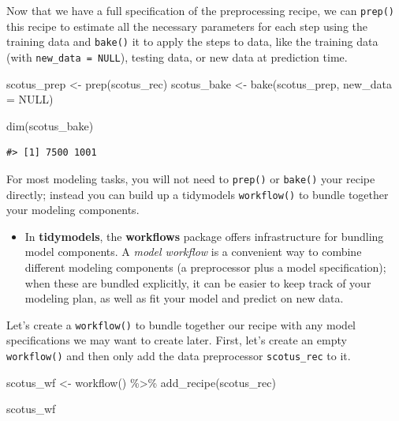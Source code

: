 \documentclass[
]{krantz}
\makeatletter
\newenvironment{Shaded}{\begin{snugshade}}{\end{snugshade}}
\newcommand{\AttributeTok}[1]{\textcolor[rgb]{0.77,0.63,0.00}{#1}}
\newcommand{\ConstantTok}[1]{\textcolor[rgb]{0.00,0.00,0.00}{#1}}
\newcommand{\FunctionTok}[1]{\textcolor[rgb]{0.00,0.00,0.00}{#1}}
\newcommand{\NormalTok}[1]{#1}
\newcommand{\OtherTok}[1]{\textcolor[rgb]{0.56,0.35,0.01}{#1}}
\newcommand{\SpecialCharTok}[1]{\textcolor[rgb]{0.00,0.00,0.00}{#1}}
\newenvironment{kframe}{%
\medskip{}
\setlength{\fboxsep}{.8em}
 \def\at@end@of@kframe{}%
 \ifinner\ifhmode%
  \def\at@end@of@kframe{\end{minipage}}%
  \begin{minipage}{\columnwidth}%
 \fi\fi%
 \def\FrameCommand##1{\hskip\@totalleftmargin \hskip-\fboxsep
 \colorbox{shadecolor}{##1}\hskip-\fboxsep
     \hskip-\linewidth \hskip-\@totalleftmargin \hskip\columnwidth}%
 \MakeFramed {\advance\hsize-\width
   \@totalleftmargin\z@ \linewidth\hsize
   \@setminipage}}%
 {\par\unskip\endMakeFramed%
 \at@end@of@kframe}
\renewenvironment{Shaded}{\begin{kframe}}{\end{kframe}}
\newenvironment{rmdblock}[1]
  {\begin{shaded*}
  \begin{itemize}[left = -1cm, labelsep = 1cm]
  \renewcommand{\labelitemi}{
    \raisebox{-.7\height}[0pt][0pt]{
      {\setkeys{Gin}{width=3em,keepaspectratio}\texttt{[image: images/\#1]}}
    }
  }
 
  \item
  }
  {
  \end{itemize}
  \end{shaded*}
  }
\newenvironment{rmdpackage}
  {\begin{rmdblock}{package}}
  {\end{rmdblock}}
\makeatother
\begin{document}
Now that we have a full specification of the preprocessing recipe, we can \texttt{prep()} this recipe to estimate all the necessary parameters for each step using the training data and \texttt{bake()} it to apply the steps to data, like the training data (with \texttt{new\_data\ =\ NULL}), testing data, or new data at prediction time.

\begin{Shaded}
\begin{Highlighting}[]
\NormalTok{scotus\_prep }\OtherTok{\textless{}{-}} \FunctionTok{prep}\NormalTok{(scotus\_rec)}
\NormalTok{scotus\_bake }\OtherTok{\textless{}{-}} \FunctionTok{bake}\NormalTok{(scotus\_prep, }\AttributeTok{new\_data =} \ConstantTok{NULL}\NormalTok{)}

\FunctionTok{dim}\NormalTok{(scotus\_bake)}
\end{Highlighting}
\end{Shaded}

\begin{verbatim}
#> [1] 7500 1001
\end{verbatim}

For most modeling tasks, you will not need to \texttt{prep()} or \texttt{bake()} your recipe directly; instead you can build up a tidymodels \texttt{workflow()} to bundle together your modeling components.

\begin{rmdpackage}
In \textbf{tidymodels}, the \textbf{workflows} package \citep{R-workflows} offers infrastructure for bundling model components. A \emph{model workflow} is a convenient way to combine different modeling components (a preprocessor plus a model specification); when these are bundled explicitly, it can be easier to keep track of your modeling plan, as well as fit your model and predict on new data.
\end{rmdpackage}

Let's create a \texttt{workflow()} to bundle together our recipe with any model specifications we may want to create later. First, let's create an empty \texttt{workflow()} and then only add the data preprocessor \texttt{scotus\_rec} to it.

\begin{Shaded}
\begin{Highlighting}[]
\NormalTok{scotus\_wf }\OtherTok{\textless{}{-}} \FunctionTok{workflow}\NormalTok{() }\SpecialCharTok{\%\textgreater{}\%}
  \FunctionTok{add\_recipe}\NormalTok{(scotus\_rec)}

\NormalTok{scotus\_wf}
\end{Highlighting}
\end{Shaded}
\end{document}
